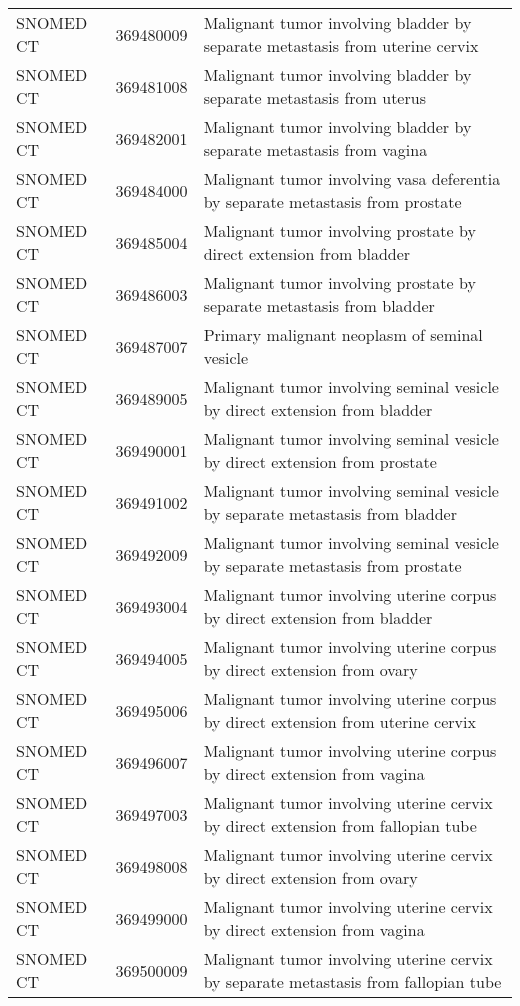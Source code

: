 \begin{longtable}{p{}p{}p{}}
  SNOMED CT & 369480009 & Malignant tumor involving bladder by separate metastasis from uterine cervix \\ 
  SNOMED CT & 369481008 & Malignant tumor involving bladder by separate metastasis from uterus \\ 
  SNOMED CT & 369482001 & Malignant tumor involving bladder by separate metastasis from vagina \\ 
  SNOMED CT & 369484000 & Malignant tumor involving vasa deferentia by separate metastasis from prostate \\ 
  SNOMED CT & 369485004 & Malignant tumor involving prostate by direct extension from bladder \\ 
  SNOMED CT & 369486003 & Malignant tumor involving prostate by separate metastasis from bladder \\ 
  SNOMED CT & 369487007 & Primary malignant neoplasm of seminal vesicle \\ 
  SNOMED CT & 369489005 & Malignant tumor involving seminal vesicle by direct extension from bladder \\ 
  SNOMED CT & 369490001 & Malignant tumor involving seminal vesicle by direct extension from prostate \\ 
  SNOMED CT & 369491002 & Malignant tumor involving seminal vesicle by separate metastasis from bladder \\ 
  SNOMED CT & 369492009 & Malignant tumor involving seminal vesicle by separate metastasis from prostate \\ 
  SNOMED CT & 369493004 & Malignant tumor involving uterine corpus by direct extension from bladder \\ 
  SNOMED CT & 369494005 & Malignant tumor involving uterine corpus by direct extension from ovary \\ 
  SNOMED CT & 369495006 & Malignant tumor involving uterine corpus by direct extension from uterine cervix \\ 
  SNOMED CT & 369496007 & Malignant tumor involving uterine corpus by direct extension from vagina \\ 
  SNOMED CT & 369497003 & Malignant tumor involving uterine cervix by direct extension from fallopian tube \\ 
  SNOMED CT & 369498008 & Malignant tumor involving uterine cervix by direct extension from ovary \\ 
  SNOMED CT & 369499000 & Malignant tumor involving uterine cervix by direct extension from vagina \\ 
  SNOMED CT & 369500009 & Malignant tumor involving uterine cervix by separate metastasis from fallopian tube \\ 

\end{longtable}
